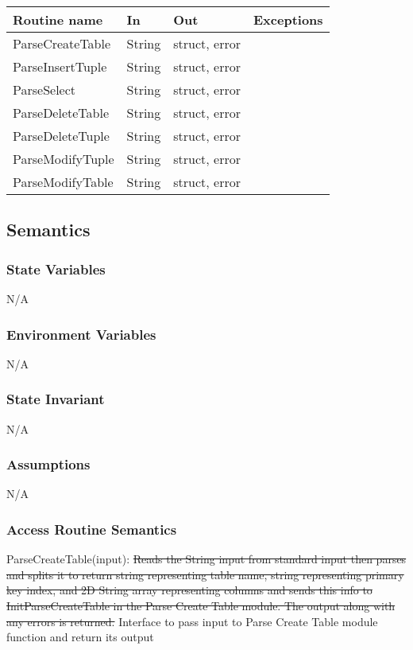 \documentclass[12pt]{article}
\begin{document}
\begin{tabular}{| l | l | l | l |}
\hline
\textbf{Routine name} & \textbf{In} & \textbf{Out} & \textbf{Exceptions}\\
\hline
ParseCreateTable & String & struct, error & \\
\hline
{\color{red}ParseInsertTuple} & String & struct, error & \\
\hline
ParseSelect & String & struct, error & \\
\hline
ParseDeleteTable & String & struct, error & \\
\hline
{\color{red}ParseDeleteTuple} & String & struct, error & \\
\hline
{\color{red}ParseModifyTuple} & String & struct, error & \\
\hline
{\color{red}ParseModifyTable} & {\color{red}String} & {\color{red}struct, error} & \\
\hline
\end{tabular}

\subsection {Semantics}

\subsubsection {State Variables}

N/A

\subsubsection {Environment Variables}
N/A

\subsubsection {State Invariant}
N/A

\subsubsection {Assumptions}
N/A


\subsubsection {Access Routine Semantics}

\noindent ParseCreateTable(input): \sout{Reads the String input from standard input then parses and splits it to return string representing table name, string representing primary key index, and 2D String array representing columns and sends this info to InitParseCreateTable in the Parse Create Table module. The output along with any errors is returned.} {\color{red} Interface to pass input to Parse Create Table module function and return its output} \\
\end{document}
